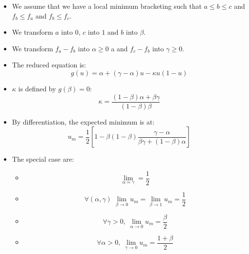 \documentclass[aps,11pt]{revtex4}
\begin{document}
\begin{itemize}
\item We assume that we have a local minimum bracketing such that $a\leq b \leq c$ and $f_b \leq f_a$ and $f_b \leq f_c$.
\item We transform $a$ into $0$, $c$ into $1$ and $b$ into $\beta$.
\item We transform $f_a-f_b$ into $\alpha \geq 0$ a and $f_c-f_b$ into $\gamma \geq 0$.
\item The reduced equation is:
\begin{equation}
	g(u) = \alpha + (\gamma-\alpha) u - \kappa u(1-u)
\end{equation}

\item $\kappa$ is defined by $g(\beta) = 0$:
\begin{equation}
	\kappa = \dfrac{(1-\beta)\alpha + \beta \gamma }{(1-\beta)\beta}
\end{equation}

\item By differentiation, the expected minimum is at:
\begin{equation}
	u_m = \dfrac{1}{2} \left\lbrack 1 - \beta(1-\beta) \dfrac{\gamma-\alpha}{\beta \gamma + (1-\beta)\alpha } \right\rbrack
\end{equation}

\item The special case are:
	\begin{itemize}
	\item
		\begin{equation}
			\lim_{\alpha\simeq\gamma} = \dfrac{1}{2}
		\end{equation}
	\item 
		\begin{equation}
			\forall (\alpha,\gamma) \; \lim_{\beta\to0} u_m = \lim_{\beta\to1} u_m = \dfrac{1}{2}
		\end{equation}
		
	\item
		\begin{equation}
			\forall \gamma>0, \; \lim_{\alpha\to0} u_m = \dfrac{\beta}{2}
		\end{equation}
	\item
		\begin{equation}
			\forall \alpha>0, \; \lim_{\gamma\to0} u_m = \dfrac{1+\beta}{2}
		\end{equation}
	\end{itemize}

	
\end{itemize}
\end{document}
